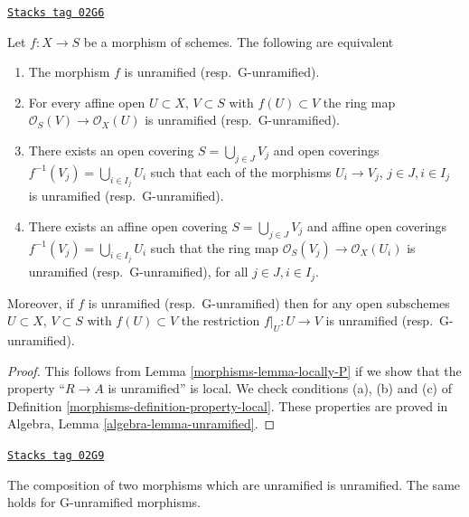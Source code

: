 \begin{lemma}
\label{morphisms-lemma-unramified-characterize}
\href{https://stacks.math.columbia.edu/tag/02G6}{\texttt{Stacks tag 02G6}}

Let $f : X \to S$ be a morphism of schemes.
The following are equivalent
\begin{enumerate}
\item The morphism $f$ is unramified (resp.\ G-unramified).
\item For every affine open $U \subset X$, $V \subset S$
with $f(U) \subset V$ the ring map
$\mathcal{O}_S(V) \to \mathcal{O}_X(U)$ is unramified (resp.\ G-unramified).
\item There exists an open covering $S = \bigcup_{j \in J} V_j$
and open coverings $f^{-1}(V_j) = \bigcup_{i \in I_j} U_i$ such
that each of the morphisms $U_i \to V_j$, $j\in J, i\in I_j$
is unramified (resp.\ G-unramified).
\item There exists an affine open covering $S = \bigcup_{j \in J} V_j$
and affine open coverings $f^{-1}(V_j) = \bigcup_{i \in I_j} U_i$ such
that the ring map $\mathcal{O}_S(V_j) \to \mathcal{O}_X(U_i)$ is
unramified (resp.\ G-unramified), for all $j\in J, i\in I_j$.
\end{enumerate}
Moreover, if $f$ is unramified (resp.\ G-unramified) then for
any open subschemes $U \subset X$, $V \subset S$ with $f(U) \subset V$
the restriction $f|_U : U \to V$ is unramified (resp.\ G-unramified).
\end{lemma}

\begin{proof}

This follows from Lemma \ref{morphisms-lemma-locally-P} if we show that
the property ``$R \to A$ is unramified'' is local.
We check conditions (a), (b) and (c) of Definition
\ref{morphisms-definition-property-local}.
These properties are proved in
Algebra, Lemma \ref{algebra-lemma-unramified}.
\end{proof}

\begin{lemma}
\label{morphisms-lemma-composition-unramified}
\href{https://stacks.math.columbia.edu/tag/02G9}{\texttt{Stacks tag 02G9}}

The composition of two morphisms which are unramified is unramified.
The same holds for G-unramified morphisms.
\end{lemma}

